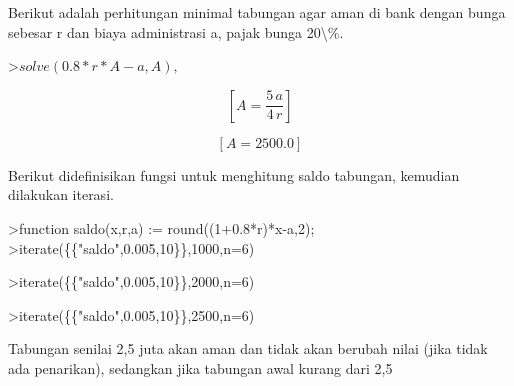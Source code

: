\documentclass{article}
\begin{document}
\begin{eulernotebook}
\begin{eulercomment}
\begin{eulercomment}
\begin{eulercomment}
\begin{eulercomment}
\begin{eulercomment}
\begin{eulercomment}
\begin{eulercomment}
\begin{eulercomment}
\begin{eulercomment}
\begin{eulercomment}
\begin{eulercomment}
\begin{eulercomment}
\begin{eulercomment}
\begin{eulercomment}
\begin{eulercomment}
\begin{eulercomment}
\begin{eulercomment}
\begin{eulercomment}
\begin{eulercomment}
\begin{eulercomment}
\begin{eulercomment}
\begin{eulercomment}
\begin{eulercomment}
\begin{eulercomment}
\begin{eulercomment}
\begin{eulercomment}
\begin{eulercomment}
\begin{eulercomment}
\begin{eulercomment}
Berikut adalah perhitungan minimal tabungan agar aman di bank dengan
bunga sebesar r dan biaya administrasi a, pajak bunga 20\textbackslash{}\%.
\end{eulercomment}
\begin{eulerprompt}
>$solve(0.8*r*A-a,A), $%
\end{eulerprompt}
\begin{eulerformula}
\[
\left[ A=\frac{5\,a}{4\,r} \right] 
\]
\end{eulerformula}
\begin{eulerformula}
\[
\left[ A=2500.0 \right] 
\]
\end{eulerformula}
\begin{eulercomment}
Berikut didefinisikan fungsi untuk menghitung saldo tabungan, kemudian
dilakukan iterasi.
\end{eulercomment}
\begin{eulerprompt}
>function saldo(x,r,a) := round((1+0.8*r)*x-a,2);
>iterate(\{\{"saldo",0.005,10\}\},1000,n=6)
\end{eulerprompt}
\begin{euleroutput}
  [1000,  994,  987.98,  981.93,  975.86,  969.76,  963.64]
\end{euleroutput}
\begin{eulerprompt}
>iterate(\{\{"saldo",0.005,10\}\},2000,n=6)
\end{eulerprompt}
\begin{euleroutput}
  [2000,  1998,  1995.99,  1993.97,  1991.95,  1989.92,  1987.88]
\end{euleroutput}
\begin{eulerprompt}
>iterate(\{\{"saldo",0.005,10\}\},2500,n=6)
\end{eulerprompt}
\begin{euleroutput}
  [2500,  2500,  2500,  2500,  2500,  2500,  2500]
\end{euleroutput}
\begin{eulercomment}
Tabungan senilai 2,5 juta akan aman dan tidak akan berubah nilai (jika
tidak ada penarikan), sedangkan jika tabungan awal kurang dari 2,5

\end{eulercomment}
\end{eulercomment}
\end{eulercomment}
\end{eulercomment}
\end{eulercomment}
\end{eulercomment}
\end{eulercomment}
\end{eulercomment}
\end{eulercomment}
\end{eulercomment}
\end{eulercomment}
\end{eulercomment}
\end{eulercomment}
\end{eulercomment}
\end{eulercomment}
\end{eulercomment}
\end{eulercomment}
\end{eulercomment}
\end{eulercomment}
\end{eulercomment}
\end{eulercomment}
\end{eulercomment}
\end{eulercomment}
\end{eulercomment}
\end{eulercomment}
\end{eulercomment}
\end{eulercomment}
\end{eulercomment}
\end{eulercomment}
\end{eulernotebook}
\end{document}
